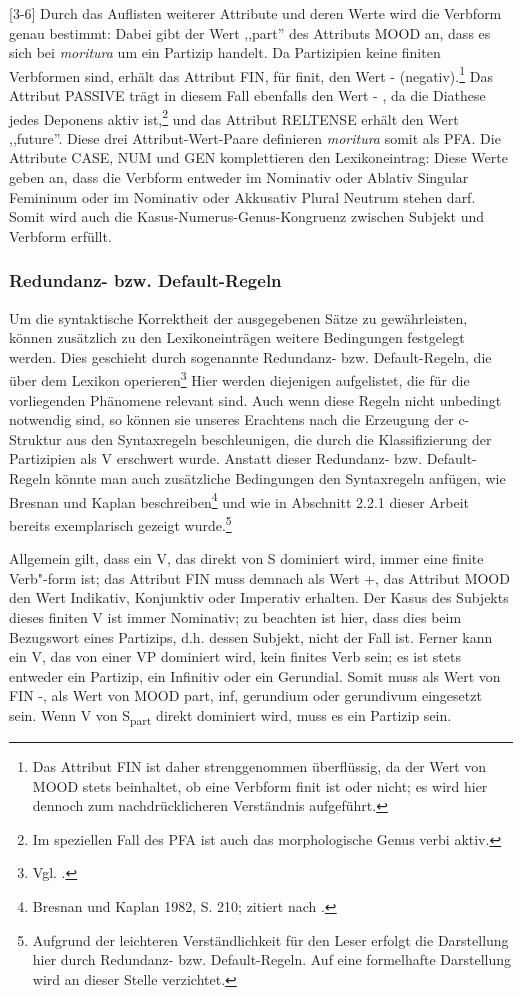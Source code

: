 \documentclass[12pt,a4paper]{article}
\begin{document}
[3-6] Durch das Auflisten weiterer Attribute und deren Werte wird die Verbform genau bestimmt: Dabei gibt der Wert ,,part'' des Attributs MOOD an, dass es sich bei \textit{moritura} um ein Partizip handelt. Da Partizipien keine finiten Verbformen sind, erhält das Attribut FIN, für finit, den Wert - (negativ).\footnote{Das Attribut FIN ist daher strenggenommen überflüssig, da der Wert von MOOD stets beinhaltet, ob eine Verbform finit ist oder nicht; es wird hier dennoch zum nachdrücklicheren Verständnis aufgeführt.} Das Attribut PASSIVE trägt in diesem Fall ebenfalls den Wert - , da die Diathese jedes Deponens aktiv ist,\footnote{Im speziellen Fall des PFA ist auch das morphologische Genus verbi aktiv.} und das Attribut RELTENSE erhält den Wert ,,future''. Diese drei Attribut-Wert-Paare definieren \textit{moritura} somit als PFA. Die Attribute CASE, NUM und GEN komplettieren den Lexikoneintrag: Diese Werte geben an, dass die Verbform entweder im Nominativ oder Ablativ Singular Femininum oder im Nominativ oder Akkusativ Plural Neutrum stehen darf. Somit wird auch die Kasus-Numerus-Genus-Kongruenz zwischen Subjekt und Verbform erfüllt.

\subsubsection{Redundanz- bzw. Default-Regeln}
Um die syntaktische Korrektheit der ausgegebenen Sätze zu gewährleisten, können zusätzlich zu den Lexikoneinträgen weitere Bedingungen festgelegt werden. Dies geschieht durch sogenannte Redundanz- bzw. Default-Regeln, die über dem Lexikon operieren\footnote{Vgl. \cite[23-4]{Rohrer}.} Hier werden diejenigen aufgelistet, die für die vorliegenden Phänomene relevant sind. Auch wenn diese Regeln nicht unbedingt notwendig sind, so können sie unseres Erachtens nach die Erzeugung der c-Struktur aus den Syntaxregeln beschleunigen, die durch die Klassifizierung der Partizipien als V erschwert wurde. Anstatt dieser Redundanz- bzw. Default-Regeln könnte man auch zusätzliche Bedingungen den Syntaxregeln anfügen, wie Bresnan und Kaplan beschreiben\footnote{Bresnan und Kaplan 1982, S. 210; zitiert nach \cite[54]{Rohrer}.} und wie in Abschnitt 2.2.1 dieser Arbeit bereits exemplarisch gezeigt wurde.\footnote{Aufgrund der leichteren Verständlichkeit für den Leser erfolgt die Darstellung hier durch Redundanz- bzw. Default-Regeln. Auf eine formelhafte Darstellung wird an dieser Stelle verzichtet.}

Allgemein gilt, dass ein V, das direkt von S dominiert wird, immer eine
finite Verb"-form ist; das Attribut FIN muss demnach als Wert +, das Attribut MOOD den Wert Indikativ, Konjunktiv oder Imperativ erhalten.
Der Kasus des Subjekts dieses finiten V ist immer Nominativ; zu beachten ist hier, dass dies beim Bezugswort eines Partizips, d.h. dessen Subjekt, nicht der Fall ist.
Ferner kann ein V, das von einer VP dominiert wird, kein finites Verb sein; es ist stets entweder ein Partizip, ein Infinitiv oder ein Gerundial. Somit muss als Wert von FIN -, als Wert von MOOD part, inf, gerundium  oder gerundivum eingesetzt sein.
Wenn V von S\textsubscript{part} direkt dominiert wird, muss es ein Partizip sein.
\end{document}
